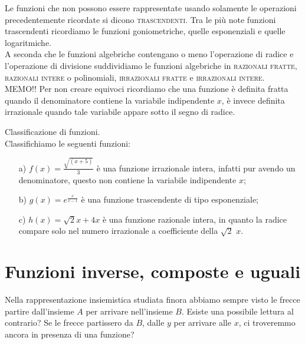 Le funzioni che non possono essere rappresentate usando solamente le 
operazioni precedentemente ricordate si dicono \textsc{trascendenti}. Tra le 
più note funzioni trascendenti ricordiamo le funzioni goniometriche, quelle 
esponenziali e quelle logaritmiche.\\

A seconda che le funzioni algebriche contengano o meno l'operazione di radice 
e l'operazione di divisione suddividiamo le funzioni algebriche in 
\textsc{razionali fratte}, \textsc{razionali intere} o polinomiali, 
\textsc{irrazionali fratte} e \textsc{irrazionali intere}. \\

\textsf{MEMO!!} Per non creare equivoci ricordiamo che una funzione è 
definita fratta quando il denominatore contiene la variabile indipendente 
\(x\), è invece definita irrazionale quando tale variabile appare sotto il 
segno di radice.\\



\begin{esempio} Classificazione di funzioni.\\
Classifichiamo le seguenti funzioni: 
  \begin{itemize}
  \item[a)] \(f(x)=\frac{\sqrt{(x+5)}}{3}\) è una funzione 
irrazionale intera, infatti pur avendo un denominatore, questo non contiene 
la variabile indipendente \(x\);
  
  \item[b)] \(g(x)=e^{\frac{x}{x-1}}\) è una funzione 
trascendente di tipo esponenziale;

  \item[c)] \(h(x)=\sqrt{2}x+4x\) è una funzione razionale 
intera, in quanto la radice compare solo nel numero irrazionale  a 
coefficiente della \(\sqrt{2}\) \(x\).
  \end{itemize}
\end{esempio}

\section{Funzioni inverse, composte e uguali}
Nella rappresentazione insiemistica studiata finora abbiamo sempre visto le 
frecce partire dall'insieme \(A\) per arrivare nell'insieme \(B\). Esiste una 
possibile lettura al contrario? Se le frecce partissero da \(B\), dalle \(y\) per 
arrivare alle \(x\), ci troveremmo ancora in presenza di una funzione?

